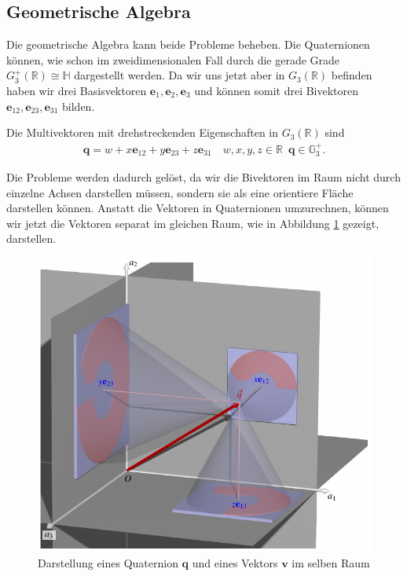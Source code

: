 \subsection{Geometrische Algebra}
Die geometrische Algebra kann beide Probleme beheben. Die Quaternionen können, wie schon im zweidimensionalen Fall durch die gerade Grade $G_3^+(\mathbb{R}) \cong \mathbb{H}$ dargestellt werden. Da wir uns jetzt aber in $G_3(\mathbb{R})$ befinden haben wir drei Basisvektoren $\mathbf{e}_1, \mathbf{e}_2, \mathbf{e}_3$ und können somit drei Bivektoren $\mathbf{e}_{12}, \mathbf{e}_{23}, \mathbf{e}_{31}$ bilden.
\begin{definition}
	Die Multivektoren mit drehstreckenden Eigenschaften in $G_3(\mathbb{R})$ sind
	\begin{align}
	\mathbf{q} = w + x\mathbf{e}_{12} + y\mathbf{e}_{23} + z\mathbf{e}_{31} \quad w,x,y,z \in \mathbb{R}\enspace \mathbf{q} \in \mathbb{G}_3^+.
	\end{align}
\end{definition}

Die Probleme werden dadurch gelöst, da wir die Bivektoren im Raum nicht durch einzelne Achsen darstellen müssen, sondern sie als eine orientiere Fläche darstellen können. Anstatt die Vektoren in Quaternionen umzurechnen, können wir jetzt die Vektoren separat im gleichen Raum, wie in Abbildung \ref{BildQuaternionen} gezeigt, darstellen. 
\begin{figure}
	\centering
	\includegraphics{papers/clifford/3d/dq.pdf}
	\caption{Darstellung eines Quaternion $\mathbf{q}$ und eines Vektors $\mathbf{v}$ im selben Raum}
	\label{BildQuaternionen}
\end{figure}

